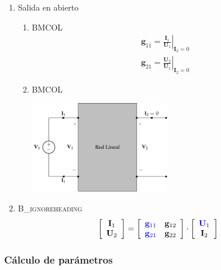 \begin{enumerate}
\item Salida en abierto
\label{sec:org490be28}

\begin{enumerate}
\item \hfill{}\textsc{BMCOL}
\label{sec:orgb210ca2}
\renewcommand{\arraystretch}{2}
\[
  \begin{array}{c}
    \mathbf{g}_{11} = \left.\frac{\mathbf{I}_1}{\mathbf{U}_1}\right\rvert_{\mathbf{I}_2 = 0} \\
    \mathbf{g}_{21} = \left.\frac{\mathbf{U}_2}{\mathbf{U}_1}\right\rvert_{\mathbf{I}_2 = 0}
  \end{array}
\]

\item \hfill{}\textsc{BMCOL}
\label{sec:orga9cc93f}

\includegraphics[height=4cm]{../figs/parametrosG_entrada.pdf}

\end{enumerate}

\item \hfill{}\textsc{B\_ignoreheading}
\label{sec:org1c0c522}
\[
  \left[
    \begin{array}{c}
      \mathbf{I}_1\\
      \mathbf{U}_2
    \end{array}
  \right] =
  \left[
    \begin{array}{cc}
      \color{blue}{\mathbf{g}_{11}} & \mathbf{g}_{12}\\
      \color{blue}{\mathbf{g}_{21}} & \mathbf{g}_{22}
    \end{array}
  \right] \cdot
  \left[
    \begin{array}{c}
      \color{blue}{\mathbf{U}_1}\\
      \mathbf{I}_2
    \end{array}
  \right]
\]
\end{enumerate}

\subsubsection{Cálculo de parámetros}
\label{sec:org4b6c520}

